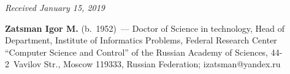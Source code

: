 \vspace*{-6pt}

\hfill{\small\textit{Received January 15, 2019}}




\Contrl

\noindent
\textbf{Zatsman Igor M.} (b.\ 1952)~--- Doctor of Science in technology, Head 
of Department, Institute of Informatics Problems, Federal Research Center 
``Computer Science and Control'' of the Russian Academy of Sciences,  
44-2~Vavilov Str., Moscow 119333, Russian Federation; 
\mbox{izatsman@yandex.ru}
\label{end\stat}

\renewcommand{\bibname}{\protect\rm Литература} 
    
    